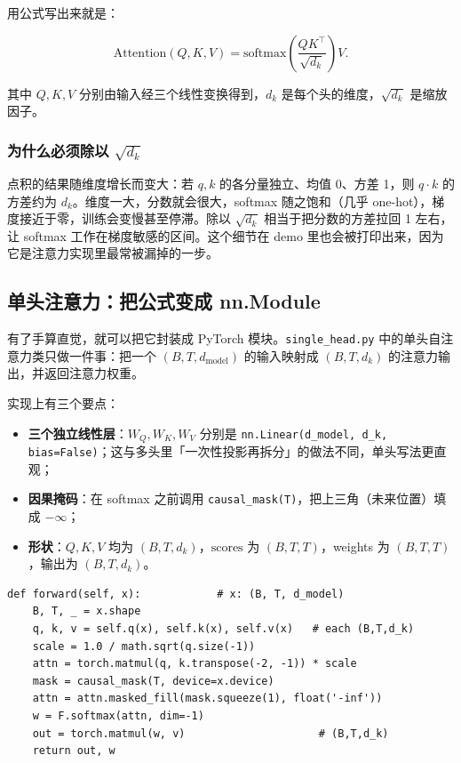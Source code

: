 用公式写出来就是：

$$
\mathrm{Attention}(Q,K,V)=\mathrm{softmax}\!\left(\frac{QK^{\top}}{\sqrt{d_k}}\right)V .
$$

其中 $Q,K,V$ 分别由输入经三个线性变换得到，$d_k$ 是每个头的维度，$\sqrt{d_k}$ 是缩放因子。

\subsubsection{为什么必须除以 $\sqrt{d_k}$}

点积的结果随维度增长而变大：若 $q,k$ 的各分量独立、均值 0、方差 1，则 $q\cdot k$ 的方差约为 $d_k$。维度一大，分数就会很大，softmax 随之饱和（几乎 one-hot），梯度接近于零，训练会变慢甚至停滞。除以 $\sqrt{d_k}$ 相当于把分数的方差拉回 1 左右，让 softmax 工作在梯度敏感的区间。这个细节在 demo 里也会被打印出来，因为它是注意力实现里最常被漏掉的一步。

\subsection{单头注意力：把公式变成 nn.Module}

有了手算直觉，就可以把它封装成 PyTorch 模块。\texttt{single\_head.py} 中的单头自注意力类只做一件事：把一个 $(B,T,d_{\text{model}})$ 的输入映射成 $(B,T,d_k)$ 的注意力输出，并返回注意力权重。

实现上有三个要点：

\begin{itemize}
\item \textbf{三个独立线性层}：$W_Q,W_K,W_V$ 分别是 \texttt{nn.Linear(d\_model, d\_k, bias=False)}；这与多头里「一次性投影再拆分」的做法不同，单头写法更直观；
\item \textbf{因果掩码}：在 softmax 之前调用 \texttt{causal\_mask(T)}，把上三角（未来位置）填成 $-\infty$；
\item \textbf{形状}：$Q,K,V$ 均为 $(B,T,d_k)$，$\text{scores}$ 为 $(B,T,T)$，weights 为 $(B,T,T)$，输出为 $(B,T,d_k)$。
\end{itemize}

\begin{lstlisting}[caption={单头自注意力的核心前向（节选自 \texttt{part\_1/single\_head.py}）}]
def forward(self, x):            # x: (B, T, d_model)
    B, T, _ = x.shape
    q, k, v = self.q(x), self.k(x), self.v(x)   # each (B,T,d_k)
    scale = 1.0 / math.sqrt(q.size(-1))
    attn = torch.matmul(q, k.transpose(-2, -1)) * scale
    mask = causal_mask(T, device=x.device)
    attn = attn.masked_fill(mask.squeeze(1), float('-inf'))
    w = F.softmax(attn, dim=-1)
    out = torch.matmul(w, v)                     # (B,T,d_k)
    return out, w
\end{lstlisting}

